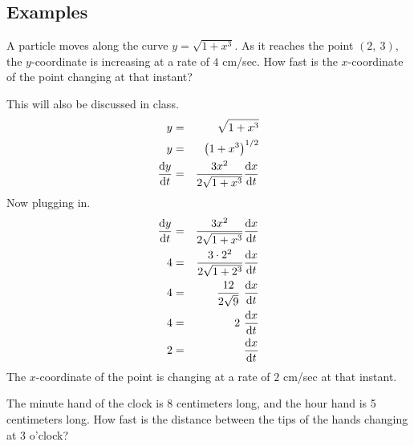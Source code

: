 \documentclass[12pt,addpoints, answers, fleqn]{exam}
\begin{document}
\subsection{Examples}

\begin{questions}



\question A particle moves along the curve $y = \sqrt{1+x^3}$. As it reaches the point $\left( 2, \ 3 \right)$, the $y$-coordinate is increasing at a rate of $4$ cm/sec. How fast is the $x$-coordinate of the point changing at that instant?
\begin{solution}
This will also be discussed in class.
\begin{eqnarray*}
y &=& \sqrt{1+x^3}\\
y &=& \left( 1+x^3 \right)^{1/2}\\
\frac{{\rm{d}} y}{{\rm{d}}t} &=& \frac{3x^2}{2\sqrt{1+x^3}} \frac{{\rm{d}} x}{{\rm{d}}t}
\end{eqnarray*}
Now plugging in.
\begin{eqnarray*}
\frac{{\rm{d}} y}{{\rm{d}}t} &=& \frac{3x^2}{2\sqrt{1+x^3}} \frac{{\rm{d}} x}{{\rm{d}}t}\\
4 &=& \frac{3 \cdot 2^2}{2\sqrt{1+2^3}} \frac{{\rm{d}} x}{{\rm{d}}t}\\
4 &=& \frac{12}{2\sqrt{9}} \ \frac{{\rm{d}} x}{{\rm{d}}t}\\
4 &=& 2 \ \frac{{\rm{d}} x}{{\rm{d}}t}\\
2 &=&  \frac{{\rm{d}} x}{{\rm{d}}t}
\end{eqnarray*}
The $x$-coordinate of the point is changing at a rate of $2$ cm/sec at that instant.
\end{solution}





\question The minute hand of the clock is 8 centimeters long, and the hour hand is 5 centimeters long. How fast is the distance between the tips of the hands changing at 3 o'clock?


\end{questions}
\end{document}
